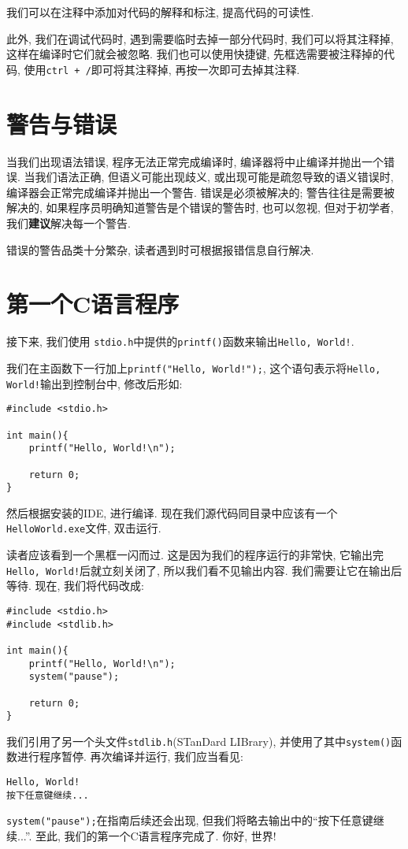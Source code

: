         我们可以在注释中添加对代码的解释和标注, 提高代码的可读性.

        此外, 我们在调试代码时, 遇到需要临时去掉一部分代码时, 我们可以将其注释掉, 这样在编译时它们就会被忽略. 我们也可以使用快捷键, 先框选需要被注释掉的代码, 使用\texttt{ctrl + /}即可将其注释掉, 再按一次即可去掉其注释.

    \section{警告与错误} \label{警告与错误}
        当我们出现语法错误, 程序无法正常完成编译时, 编译器将中止编译并抛出一个错误. 当我们语法正确, 但语义可能出现歧义, 或出现可能是疏忽导致的语义错误时, 编译器会正常完成编译并抛出一个警告. 错误是必须被解决的; 警告往往是需要被解决的, 如果程序员明确知道警告是个错误的警告时, 也可以忽视, 但对于初学者, 我们\textbf{建议}解决每一个警告.

        错误的警告品类十分繁杂, 读者遇到时可根据报错信息自行解决.

    \section{第一个C语言程序} \label{第一个C语言程序}
        接下来, 我们使用 \texttt{stdio.h}中提供的\texttt{printf()}函数来输出\texttt{Hello, World!}.

        我们在主函数下一行加上\texttt{printf("Hello, World!");}, 这个语句表示将\texttt{Hello, World!}输出到控制台中, 修改后形如:
\begin{lstlisting}
#include <stdio.h>

int main(){
    printf("Hello, World!\n");

    return 0;
}
\end{lstlisting}

        然后根据安装的IDE, 进行编译. 现在我们源代码同目录中应该有一个\texttt{HelloWorld.exe}文件, 双击运行.

        读者应该看到一个黑框一闪而过. 这是因为我们的程序运行的非常快, 它输出完\texttt{Hello, World!}后就立刻关闭了, 所以我们看不见输出内容. 我们需要让它在输出后等待. 现在, 我们将代码改成:
\begin{lstlisting}
#include <stdio.h>
#include <stdlib.h>

int main(){
    printf("Hello, World!\n");
    system("pause");

    return 0;
}
\end{lstlisting}

        我们引用了另一个头文件\texttt{stdlib.h}(STanDard LIBrary), 并使用了其中\texttt{system()}函数进行程序暂停. 再次编译并运行, 我们应当看见:
\begin{lstlisting}
Hello, World!
按下任意键继续...
\end{lstlisting}

        \texttt{system("pause");}在指南后续还会出现, 但我们将略去输出中的``按下任意键继续...''. 至此, 我们的第一个C语言程序完成了. 你好, 世界!